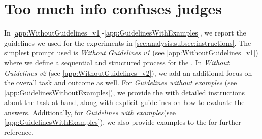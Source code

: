 \section{Too much info confuses judges}
\label{app:TMI}
In \cref{app:WithoutGuidelines_v1}-\ref{app:GuidelinesWithExamples}, we report the guidelines we used for the experiments in \cref{sec:analysis:subsec:instructions}. 
The simplest prompt used is \textit{Without Guidelines v1} (see \cref{app:WithoutGuidelines_v1}) where we define a sequential and structured process for the \judgemodel. 
In \textit{Without Guidelines v2} (see \cref{app:WithoutGuidelines_v2}), we add an additional focus on the overall task and outcome as well. 
% 
For \textit{Guidelines without examples} (see \cref{app:GuidelinesWithoutExamples}), we provide the \judgemodels with detailed instructions about the task at hand, along with explicit guidelines on how to evaluate the answers. 
Additionally, for \textit{Guidelines with examples}(see \cref{app:GuidelinesWithExamples}), we also provide examples to the \judgemodels for further reference.





